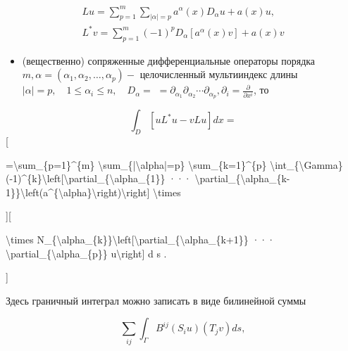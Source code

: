 \documentclass[10pt]{article}
\begin{document}
\[

\begin{gathered}

L u=\sum_{p=1}^{m} \sum_{|\alpha|=p} a^{\alpha}(x) D_{\alpha} u+a(x) u, \\

L^{*} v=\sum_{p=1}^{m}(-1)^{p} D_{\alpha}\left[a^{\alpha}(x) v\right]+a(x) v

\end{gathered}

\]



\begin{itemize}

  \item (вещественно) сопряженные дифференциальные операторы порядка $m, \alpha=\left(\alpha_{1}, \alpha_{2}, \ldots, \alpha_{p}\right)-$ целочисленный мультииндекс длины $|\alpha|=p, \quad 1 \leqslant \alpha_{i} \leqslant n, \quad D_{\alpha}=$ $=\partial_{\alpha_{1}} \partial_{\alpha_{2}} \cdots \partial_{\alpha_{p}}, \partial_{i}=\frac{\partial}{\partial x^{i}}$, то

\end{itemize}



\[

\int_{D}\left[u L^{*} u-v L u\right] d x=

\][



=\textbackslash sum\_\{p=1\}\^{}\{m\} \textbackslash sum\_\{|\textbackslash alpha|=p\} \textbackslash sum\_\{k=1\}\^{}\{p\} \textbackslash int\_\{\textbackslash Gamma\}(-1)\^{}\{k\}\textbackslash left[\textbackslash partial\_\{\textbackslash alpha\_\{1\}\} ··· \textbackslash partial\_\{\textbackslash alpha\_\{k-1\}\}\textbackslash left(a\^{}\{\textbackslash alpha\}\textbackslash right)\textbackslash right] \textbackslash times



][



\textbackslash times N\_\{\textbackslash alpha\_\{k\}\}\textbackslash left[\textbackslash partial\_\{\textbackslash alpha\_\{k+1\}\} ··· \textbackslash partial\_\{\textbackslash alpha\_\{p\}\} u\textbackslash right] d s .

]



Здесь граничный интеграл можно записать в виде билинейной суммы



\[

\sum_{i j} \int_{\Gamma} B^{i j}\left(S_{i} u\right)\left(T_{j} v\right) d s,

\]
\end{document}
